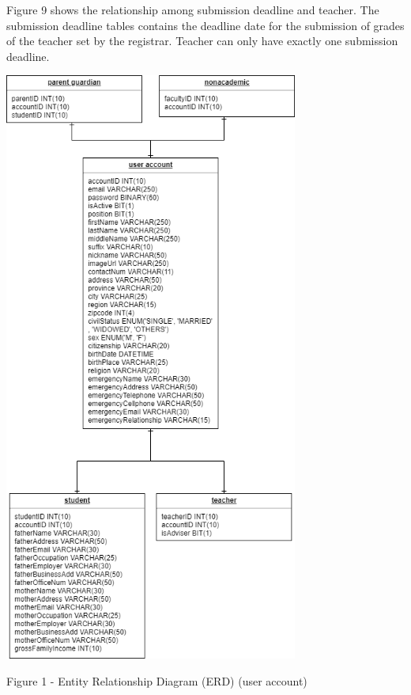 \documentclass[11pt,a4paper,titlepage]{article}
\begin{document}
Figure 9 shows the relationship among submission deadline and teacher. The submission deadline tables contains the deadline date for the submission of grades of the teacher set by the registrar. Teacher can only have exactly one submission deadline.

\vspace{1cm}
\newpage
\begin{center}
    \includegraphics[height=19.5cm]{User.png}
\end{center}
\vspace{1cm}
\begin{center}
    Figure 1 - Entity Relationship Diagram (ERD) (user account)
\end{center}
\end{document}
